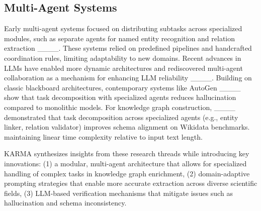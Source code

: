 \subsection{Multi-Agent Systems}
Early multi-agent systems focused on distributing subtasks across specialized modules, such as separate agents for named entity recognition and relation extraction ____. These systems relied on predefined pipelines and handcrafted coordination rules, limiting adaptability to new domains. Recent advances in LLMs have enabled more dynamic architectures and rediscovered multi-agent collaboration as a mechanism for enhancing LLM reliability ____. Building on classic blackboard architectures, contemporary systems like AutoGen ____ show that task decomposition with specialized agents reduces hallucination compared to monolithic models. For knowledge graph construction, ____ demonstrated that task decomposition across specialized agents (e.g., entity linker, relation validator) improves schema alignment on Wikidata benchmarks. maintaining linear time complexity relative to input text length.

KARMA synthesizes insights from these research threads while introducing key innovations: (1) a modular, multi-agent architecture that allows for specialized handling of complex tasks in knowledge graph enrichment, (2) domain-adaptive prompting strategies that enable more accurate extraction across diverse scientific fields, (3) LLM-based verification mechanisms that mitigate issues such as hallucination and schema inconsistency.